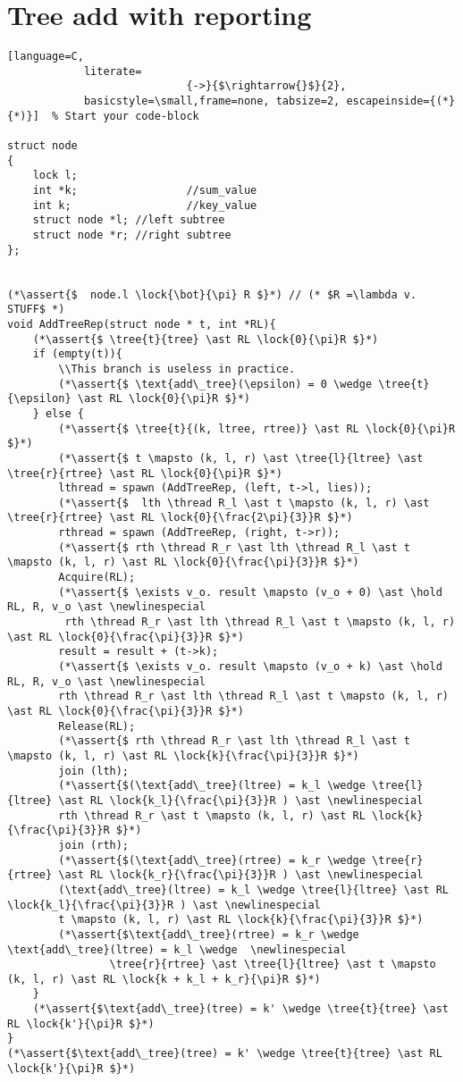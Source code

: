 \documentclass[8pt]{article}
\newcommand{\lock}[2]{ \square \hspace{-1ex} \xrightarrow[#1]{#2}}
\newcommand{\thread}{\ocircle \hspace{-1ex} \rightarrow}
\newcommand{\hold}{\text{Hold }}
\newcommand{\assert}[1]{\textcolor{blue}{ \{ #1 \}  } }
\newcommand{\tree}[2]{#1 \rightarrowtail #2}
\newcommand{\newlinespecial}{\newline \hphantom{100pt}}
\begin{document}


\newpage
\section{Tree add with reporting}
\begin{lstlisting}[language=C,
			literate=
               				{->}{$\rightarrow{}$}{2},
			basicstyle=\small,frame=none, tabsize=2, escapeinside={(*}{*)}]  % Start your code-block

struct node
{
	lock l;
	int *k;					//sum_value
	int k;					//key_value
	struct node *l; //left subtree
	struct node *r; //right subtree
};


(*\assert{$  node.l \lock{\bot}{\pi} R $}*) // (* $R =\lambda v.  STUFF$ *)
void AddTreeRep(struct node * t, int *RL){
	(*\assert{$ \tree{t}{tree} \ast RL \lock{0}{\pi}R $}*)
	if (empty(t)){
		\\This branch is useless in practice.
		(*\assert{$ \text{add\_tree}(\epsilon) = 0 \wedge \tree{t}{\epsilon} \ast RL \lock{0}{\pi}R $}*)
	} else {
		(*\assert{$ \tree{t}{(k, ltree, rtree)} \ast RL \lock{0}{\pi}R $}*)
		(*\assert{$ t \mapsto (k, l, r) \ast \tree{l}{ltree} \ast \tree{r}{rtree} \ast RL \lock{0}{\pi}R $}*)
		lthread = spawn (AddTreeRep, (left, t->l, lies));
		(*\assert{$  lth \thread R_l \ast t \mapsto (k, l, r) \ast \tree{r}{rtree} \ast RL \lock{0}{\frac{2\pi}{3}}R $}*)
		rthread = spawn (AddTreeRep, (right, t->r));
		(*\assert{$ rth \thread R_r \ast lth \thread R_l \ast t \mapsto (k, l, r) \ast RL \lock{0}{\frac{\pi}{3}}R $}*)
		Acquire(RL);
		(*\assert{$ \exists v_o. result \mapsto (v_o + 0) \ast \hold RL, R, v_o \ast \newlinespecial 
		 rth \thread R_r \ast lth \thread R_l \ast t \mapsto (k, l, r) \ast RL \lock{0}{\frac{\pi}{3}}R $}*)
		result = result + (t->k);
		(*\assert{$ \exists v_o. result \mapsto (v_o + k) \ast \hold RL, R, v_o \ast \newlinespecial 
		rth \thread R_r \ast lth \thread R_l \ast t \mapsto (k, l, r) \ast RL \lock{0}{\frac{\pi}{3}}R $}*)
		Release(RL);
		(*\assert{$ rth \thread R_r \ast lth \thread R_l \ast t \mapsto (k, l, r) \ast RL \lock{k}{\frac{\pi}{3}}R $}*)
		join (lth);
		(*\assert{$(\text{add\_tree}(ltree) = k_l \wedge \tree{l}{ltree} \ast RL \lock{k_l}{\frac{\pi}{3}}R ) \ast \newlinespecial 
		rth \thread R_r \ast t \mapsto (k, l, r) \ast RL \lock{k}{\frac{\pi}{3}}R $}*)
		join (rth);
		(*\assert{$(\text{add\_tree}(rtree) = k_r \wedge \tree{r}{rtree} \ast RL \lock{k_r}{\frac{\pi}{3}}R ) \ast \newlinespecial 
		(\text{add\_tree}(ltree) = k_l \wedge \tree{l}{ltree} \ast RL \lock{k_l}{\frac{\pi}{3}}R ) \ast \newlinespecial 
		t \mapsto (k, l, r) \ast RL \lock{k}{\frac{\pi}{3}}R $}*)
		(*\assert{$\text{add\_tree}(rtree) = k_r \wedge \text{add\_tree}(ltree) = k_l \wedge  \newlinespecial 
				\tree{r}{rtree} \ast \tree{l}{ltree} \ast t \mapsto (k, l, r) \ast RL \lock{k + k_l + k_r}{\pi}R $}*)
	} 
	(*\assert{$\text{add\_tree}(tree) = k' \wedge \tree{t}{tree} \ast RL \lock{k'}{\pi}R $}*)
}	
(*\assert{$\text{add\_tree}(tree) = k' \wedge \tree{t}{tree} \ast RL \lock{k'}{\pi}R $}*)	

\end{lstlisting}
\end{document}
